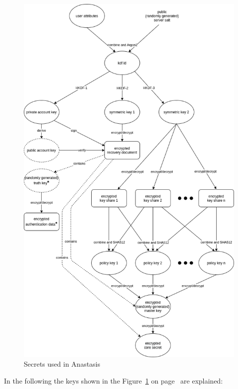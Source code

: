 \begin{figure}[H]
	\centering
	\includegraphics[scale=0.48]{images/keys_anastasis.png}
	\caption{Secrets used in Anastasis}
	\label{fig:keys_anastasis}
\end{figure}

\noindent In the following the keys shown in the Figure~\ref{fig:keys_anastasis} on
page~\pageref{fig:keys_anastasis} are explained:

